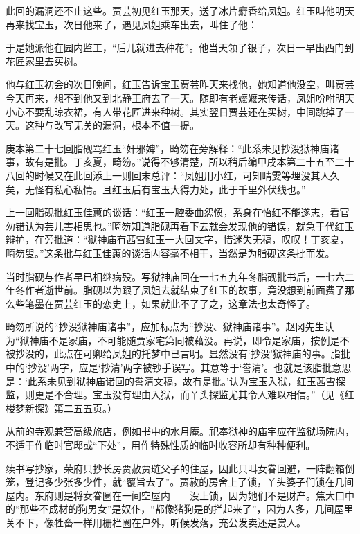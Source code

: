 \par 此回的漏洞还不止这些。贾芸初见红玉那天，送了冰片麝香给凤姐。红玉叫他明天再来找宝玉，次日他来了，遇见凤姐乘车出去，叫住了他：
\par 于是她派他在园内监工，“后儿就进去种花”。他当天领了银子，次日一早出西门到花匠家里去买树。
\par 他与红玉初会的次日晚间，红玉告诉宝玉贾芸昨天来找他，她知道他没空，叫贾芸今天再来，想不到他又到北静王府去了一天。随即有老嬷嬷来传话，凤姐吩咐明天小心不要乱晾衣裙，有人带花匠进来种树。其实翌日贾芸还在买树，中间跳掉了一天。这种与改写无关的漏洞，根本不值一提。
\par 庚本第二十七回脂砚骂红玉“奸邪婢”，畸笏在旁解释：“此系未见抄没狱神庙诸事，故有是批。丁亥夏，畸笏。”说得不够清楚，所以稍后编甲戌本第二十五至二十八回的时候又在此回添上一则回末总评：“凤姐用小红，可知晴雯等埋没其人久矣，无怪有私心私情。且红玉后有宝玉大得力处，此于千里外伏线也。”
\par 上一回脂砚批红玉佳蕙的谈话：“红玉一腔委曲怨愤，系身在怡红不能遂志，看官勿错认为芸儿害相思也。”畸笏知道脂砚再看下去就会发现他的错误，就急于代红玉辩护，在旁批道：“狱神庙有茜雪红玉一大回文字，惜迷失无稿，叹叹！丁亥夏，畸笏叟。”这条批与红玉佳蕙的谈话内容毫不相干，当然是为脂砚这条批而发。
\par 当时脂砚与作者早已相继病殁。写狱神庙回在一七五九年冬脂砚批书后，一七六二年冬作者逝世前。脂砚以为跟了凤姐去就结束了红玉的故事，竟没想到前面费了那么些笔墨在贾芸红玉的恋史上，如果就此不了了之，这章法也太奇怪了。
\par 畸笏所说的“抄没狱神庙诸事”，应加标点为“抄没、狱神庙诸事”。赵冈先生认为“狱神庙不是家庙，不可能随贾家宅第同被藉没。再说，即令是家庙，按例是不被抄没的，此点在可卿给凤姐的托梦中已言明。显然没有‘抄没’狱神庙的事。脂批中的‘抄没’两字，应是‘抄清’两字被钞手误写。其意等于‘誊清’。也就是该脂批意思是：‘此系未见到狱神庙诸回的誊清文稿，故有是批。’认为宝玉入狱，红玉茜雪探监，则更是不合理。宝玉没有理由入狱，而丫头探监尤其令人难以相信。”（见《红楼梦新探》第二五五页。）
\par 从前的寺观兼营高级旅店，例如书中的水月庵。祀奉狱神的庙宇应在监狱场院内，不适于作临时官邸或“下处”，用作特殊性质的临时收容所却有种种便利。
\par 续书写抄家，荣府只抄长房贾赦贾琏父子的住屋，因此只叫女眷回避，一阵翻箱倒笼，登记多少张多少件，就“覆旨去了”。贾赦的房舍上了锁，丫头婆子们锁在几间屋内。东府则是将女眷圈在一间空屋内——没上锁，因为她们不是财产。焦大口中的“那些不成材的狗男女”是奴仆，“都像猪狗是的拦起来了”，因为人多，几间屋里关不下，像牲畜一样用栅栏圈在户外，听候发落，充公发卖还是赏人。
